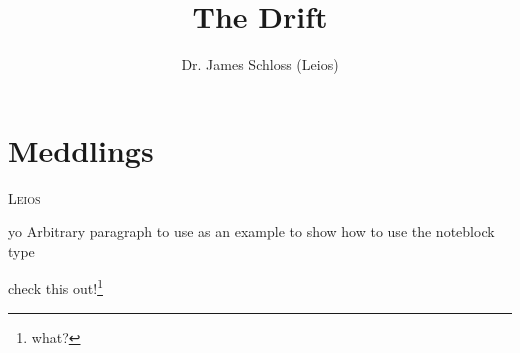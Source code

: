 \documentclass[11pt]{book}
\title{\textbf{The Drift}}
\author{Dr. James Schloss (Leios)}
\date{}
\makeatletter
\newcommand{\chapterauthor}[1]{%
  {\parindent0pt\vspace*{-25pt}%
  \linespread{1.1}\large\scshape#1%
  \par\nobreak\vspace*{35pt}}
  \@afterheading%
}
\makeatother
\begin{document}
\maketitle




\newpage

\chapter{Meddlings}
\chapterauthor{Leios}

\begin{noteblock}{yo}
Arbitrary paragraph to use as an example to show how to use the noteblock type
\end{noteblock}

check this out!\footnote{what?}
\end{document}
